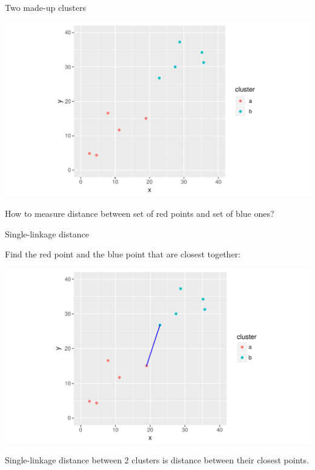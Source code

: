 \begin{frame}[fragile]{Two made-up clusters}
  
\begin{knitrout}
\color{fgcolor}
\includegraphics[width=\maxwidth]{figure/unnamed-chunk-2-1} 

\end{knitrout}

How to measure distance between set of red points and set of blue
ones? 
  
\end{frame}

\begin{frame}[fragile]{Single-linkage distance}
  
  Find the red point and the blue point that are closest together:
  
\begin{knitrout}
\color{fgcolor}
\includegraphics[width=\maxwidth]{figure/unnamed-chunk-3-1} 

\end{knitrout}

Single-linkage distance between 2 clusters is distance between their
closest points.
  
\end{frame}

